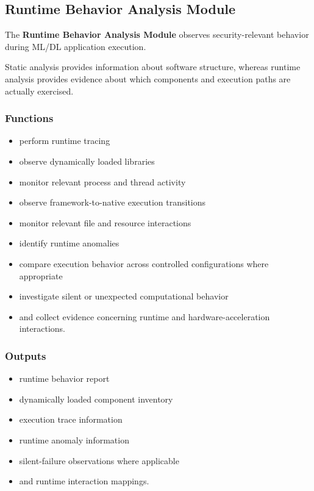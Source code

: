 \documentclass[
  12pt,
  letterpaper,
  oneside]{report}
\providecommand{\tightlist}{%
  \setlength{\itemsep}{0pt}\setlength{\parskip}{0pt}}
\begin{document}
\subsection{Runtime Behavior Analysis Module}\label{1036-runtime-behavior-analysis-module}

The \textbf{Runtime Behavior Analysis Module} observes security-relevant
behavior during ML/DL application execution.

Static analysis provides information about software structure, whereas
runtime analysis provides evidence about which components and execution
paths are actually exercised.

\subsubsection{Functions}\label{functions-5}

\begin{itemize}
\tightlist
\item
  perform runtime tracing
\item
  observe dynamically loaded libraries
\item
  monitor relevant process and thread activity
\item
  observe framework-to-native execution transitions
\item
  monitor relevant file and resource interactions
\item
  identify runtime anomalies
\item
  compare execution behavior across controlled configurations where
  appropriate
\item
  investigate silent or unexpected computational behavior
\item
  and collect evidence concerning runtime and hardware-acceleration
  interactions.
\end{itemize}

\subsubsection{Outputs}\label{outputs-5}

\begin{itemize}
\tightlist
\item
  runtime behavior report
\item
  dynamically loaded component inventory
\item
  execution trace information
\item
  runtime anomaly information
\item
  silent-failure observations where applicable
\item
  and runtime interaction mappings.
\end{itemize}
\end{document}
